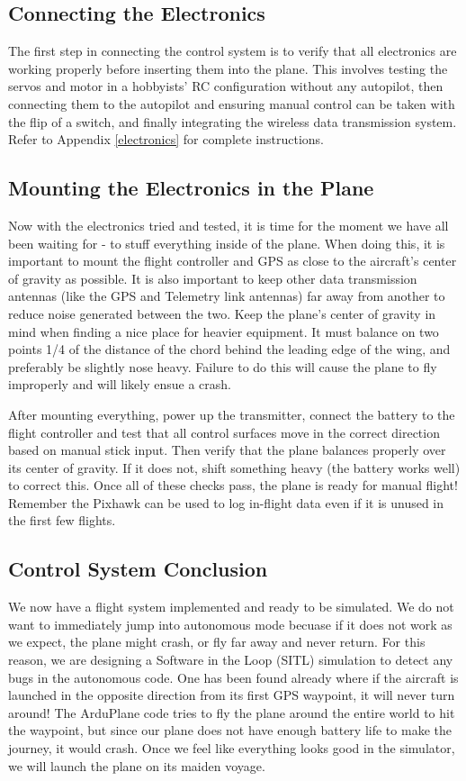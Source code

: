 \documentclass[12pt,journal,compsoc]{IEEEtran}
\begin{document}
\subsection{Connecting the Electronics}
The first step in connecting the control system is to verify that all electronics are working properly before inserting them into the plane. This involves testing the servos and motor in a hobbyists' RC configuration without any autopilot, then connecting them to the autopilot and ensuring manual control can be taken with the flip of a switch, and finally integrating the wireless data transmission system. Refer to Appendix \ref{electronics} for complete instructions.

\subsection{Mounting the Electronics in the Plane}
Now with the electronics tried and tested, it is time for the moment we have all been waiting for - to stuff everything inside of the plane. When doing this, it is important to mount the flight controller and GPS as close to the aircraft's center of gravity as possible. It is also important to keep other data transmission antennas (like the GPS and Telemetry link antennas) far away from another to reduce noise generated between the two. Keep the plane's center of gravity in mind when finding a nice place for heavier equipment. It must balance on two points 1/4 of the distance of the chord behind the leading edge of the wing, and preferably be slightly nose heavy. Failure to do this will cause the plane to fly improperly and will likely ensue a crash.

After mounting everything, power up the transmitter, connect the battery to the flight controller and test that all control surfaces move in the correct direction based on manual stick input. Then verify that the plane balances properly over its center of gravity. If it does not, shift something heavy (the battery works well) to correct this. Once all of these checks pass, the plane is ready for manual flight! Remember the Pixhawk can be used to log in-flight data even if it is unused in the first few flights.

\subsection{Control System Conclusion}
We now have a flight system implemented and ready to be simulated. We do not want to immediately jump into autonomous mode becuase if it does not work as we expect, the plane might crash, or fly far away and never return. For this reason, we are designing a Software in the Loop (SITL) simulation to detect any bugs in the autonomous code. One has been found already where if the aircraft is launched in the opposite direction from its first GPS waypoint, it will never turn around! The ArduPlane code tries to fly the plane around the entire world to hit the waypoint, but since our plane does not have enough battery life to make the journey, it would crash. Once we feel like everything looks good in the simulator, we will launch the plane on its maiden voyage.
\end{document}

